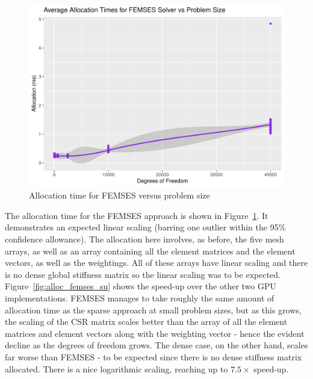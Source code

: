 \begin{figure}
	\centering
	\includegraphics[width=0.48\linewidth]{Plots/alloc_femses_vs_n}
	\caption{Allocation time for FEMSES versus problem size}
	\label{fig:alloc_femses}
\end{figure}
The allocation time for the FEMSES approach is shown in Figure~\ref{fig:alloc_femses}. It demonstrates an expected linear scaling (barring one outlier within the 95\% confidence allowance). The allocation here involves, as before, the five mesh arrays, as well as an array containing all the element matrices and the element vectors, as well as the weightings. All of these arrays have linear scaling and there is no dense global stiffness matrix so the linear scaling was to be expected. Figure~\ref{fig:alloc_femses_su} shows the speed-up over the other two GPU implementations. FEMSES manages to take roughly the same amount of allocation time as the sparse approach at small problem sizes, but as this grows, the scaling of the CSR matrix scales better than the array of all the element matrices and element vectors along with the weighting vector - hence the evident decline as the degrees of freedom grows. The dense case, on the other hand, scales far worse than FEMSES - to be expected since there is no dense stiffness matrix allocated. There is a nice logarithmic scaling, reaching up to $7.5\times$ speed-up.

